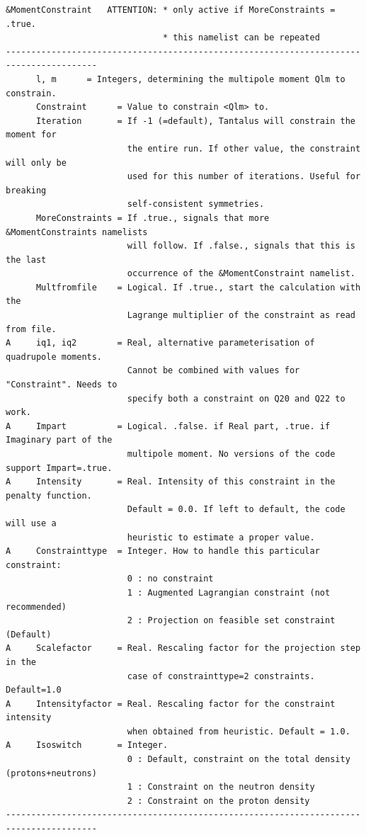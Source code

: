 \documentclass[print,amsmath,amssymb,aps,prc,nofootinbib,notitlepage]{revtex4-1}
\begin{document}
\begin{Verbatim}
&MomentConstraint   ATTENTION: * only active if MoreConstraints = .true. 
                               * this namelist can be repeated   
----------------------------------------------------------------------------------------
      l, m      = Integers, determining the multipole moment Qlm to constrain.
      Constraint      = Value to constrain <Qlm> to.
      Iteration       = If -1 (=default), Tantalus will constrain the moment for 
                        the entire run. If other value, the constraint will only be 
                        used for this number of iterations. Useful for breaking 
                        self-consistent symmetries.
      MoreConstraints = If .true., signals that more &MomentConstraints namelists
                        will follow. If .false., signals that this is the last 
                        occurrence of the &MomentConstraint namelist.
      Multfromfile    = Logical. If .true., start the calculation with the 
                        Lagrange multiplier of the constraint as read from file.
A     iq1, iq2        = Real, alternative parameterisation of quadrupole moments.
                        Cannot be combined with values for "Constraint". Needs to 
                        specify both a constraint on Q20 and Q22 to work.
A     Impart          = Logical. .false. if Real part, .true. if Imaginary part of the
                        multipole moment. No versions of the code support Impart=.true.
A     Intensity       = Real. Intensity of this constraint in the penalty function.
                        Default = 0.0. If left to default, the code will use a
                        heuristic to estimate a proper value.
A     Constrainttype  = Integer. How to handle this particular constraint:
                        0 : no constraint
                        1 : Augmented Lagrangian constraint (not recommended)
                        2 : Projection on feasible set constraint (Default)
A     Scalefactor     = Real. Rescaling factor for the projection step in the 
                        case of constrainttype=2 constraints. Default=1.0
A     Intensityfactor = Real. Rescaling factor for the constraint intensity 
                        when obtained from heuristic. Default = 1.0.
A     Isoswitch       = Integer. 
                        0 : Default, constraint on the total density (protons+neutrons)
                        1 : Constraint on the neutron density
                        2 : Constraint on the proton density
----------------------------------------------------------------------------------------
\end{Verbatim}
\end{document}
